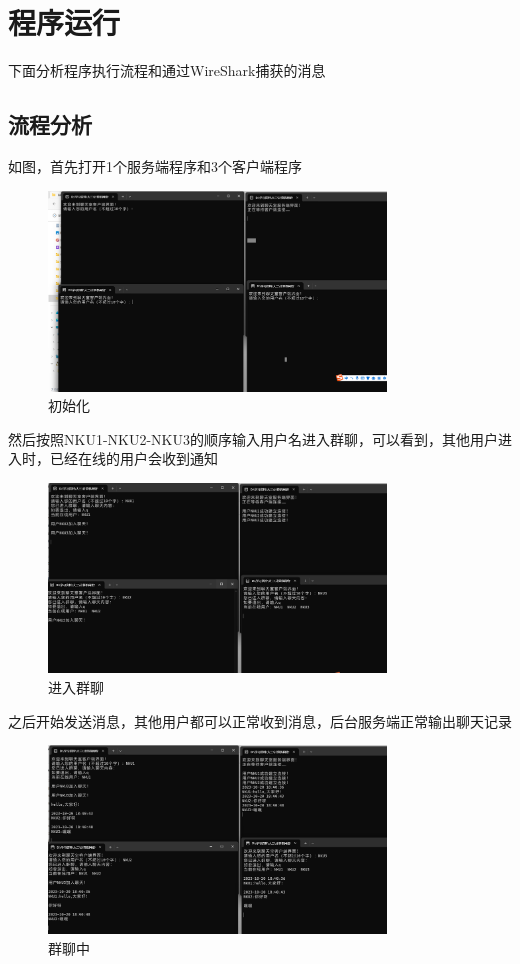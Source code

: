 \documentclass[UTF8,a4paper,10pt]{ctexart}
\begin{document}
\section{程序运行}
下面分析程序执行流程和通过WireShark捕获的消息

\subsection{流程分析}
如图，首先打开1个服务端程序和3个客户端程序
\begin{figure}[H]
    \centering
\includegraphics[width=0.8\textwidth]{img/初始化.png}
    \caption{初始化}
\end{figure}
然后按照NKU1-NKU2-NKU3的顺序输入用户名进入群聊，可以看到，其他用户进入时，已经在线的用户会收到通知
\begin{figure}[H]
    \centering
\includegraphics[width=0.8\textwidth]{img/进入群聊.png}
    \caption{进入群聊}
\end{figure}
之后开始发送消息，其他用户都可以正常收到消息，后台服务端正常输出聊天记录
\begin{figure}[H]
    \centering
\includegraphics[width=0.8\textwidth]{img/群聊中.png}
    \caption{群聊中}
\end{figure}
\end{document}
